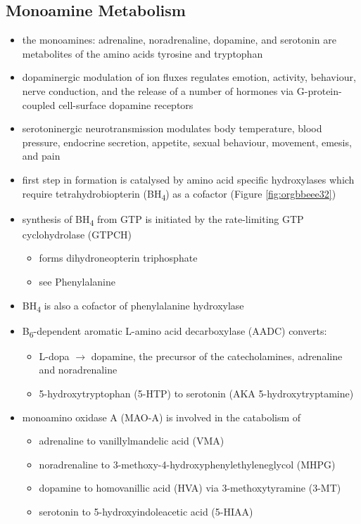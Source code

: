 \documentclass[12pt]{scrartcl}
\begin{document}
\subsection{Monoamine Metabolism}
\label{sec:org2503c22}
\begin{itemize}
\item the monoamines: adrenaline, noradrenaline, dopamine, and serotonin
are metabolites of the amino acids tyrosine and tryptophan
\item dopaminergic modulation of ion fluxes regulates emotion, activity,
behaviour, nerve conduction, and the release of a number of hormones
via G-protein-coupled cell-surface dopamine
receptors
\item serotoninergic neurotransmission modulates body temperature, blood
pressure, endocrine secretion, appetite, sexual behaviour, movement,
emesis, and pain
\item first step in formation is catalysed by amino acid specific
hydroxylases which require tetrahydrobiopterin (BH\textsubscript{4}) as a cofactor
(Figure \ref{fig:orgbbeee32})
\item synthesis of BH\textsubscript{4} from GTP is initiated by the rate-limiting GTP
cyclohydrolase (GTPCH)
\begin{itemize}
\item forms dihydroneopterin triphosphate
\item see Phenylalanine
\end{itemize}
\item BH\textsubscript{4} is also a cofactor of phenylalanine hydroxylase
\item B\textsubscript{6}-dependent aromatic L-amino acid decarboxylase (AADC) converts:
\begin{itemize}
\item L-dopa \(\to\) dopamine, the precursor of the catecholamines,
adrenaline and noradrenaline
\item 5-hydroxytryptophan (5-HTP) to serotonin (AKA 5-hydroxytryptamine)
\end{itemize}
\item monoamino oxidase A (MAO-A) is involved in the catabolism of
\begin{itemize}
\item adrenaline to vanillylmandelic acid (VMA)
\item noradrenaline to 3-methoxy-4-hydroxyphenylethyleneglycol (MHPG)
\item dopamine to homovanillic acid (HVA) via 3-methoxytyramine (3-MT)
\item serotonin to 5-hydroxyindoleacetic acid (5-HIAA)
\end{itemize}
\end{itemize}
\end{document}
